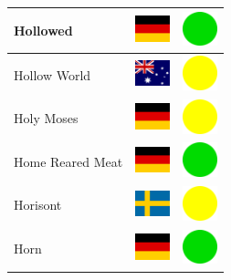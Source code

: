 \documentclass[12pt, a4paper, twoside]{report}
\begin{document}
\begin{center}
\begin{longtable}{|p{5cm}|p{2cm}|p{2cm}|}
 Hollowed                                                   & \includegraphics[width=1cm]{../img/flags/de} &   \includegraphics[width=1cm]{../likes/y} \\ \hline
 Hollow World                                               & \includegraphics[width=1cm]{../img/flags/au} &   \includegraphics[width=1cm]{../likes/m} \\ \hline
 Holy Moses                                                 & \includegraphics[width=1cm]{../img/flags/de} &   \includegraphics[width=1cm]{../likes/m} \\ \hline
 Home Reared Meat                                           & \includegraphics[width=1cm]{../img/flags/de} &   \includegraphics[width=1cm]{../likes/y} \\ \hline
 Horisont                                                   & \includegraphics[width=1cm]{../img/flags/se} &   \includegraphics[width=1cm]{../likes/m} \\ \hline
 Horn                                                       & \includegraphics[width=1cm]{../img/flags/de} &   \includegraphics[width=1cm]{../likes/y} \\ \hline

\end{longtable}
\end{center}
\end{document}
